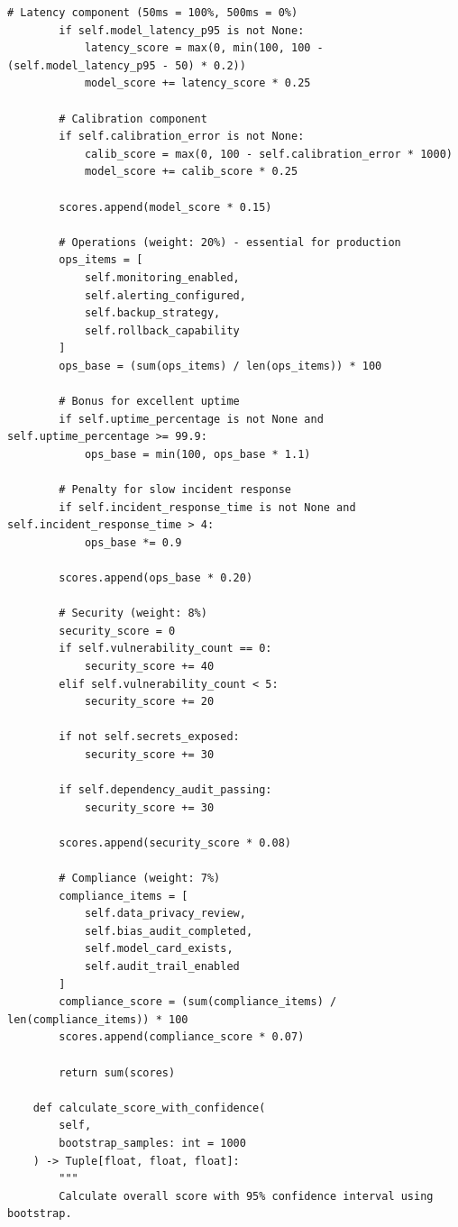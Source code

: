 \begin{lstlisting}[style=python, caption={Comprehensive project health metrics framework with 15+ dimensions}]
        # Latency component (50ms = 100%, 500ms = 0%)
        if self.model_latency_p95 is not None:
            latency_score = max(0, min(100, 100 - (self.model_latency_p95 - 50) * 0.2))
            model_score += latency_score * 0.25

        # Calibration component
        if self.calibration_error is not None:
            calib_score = max(0, 100 - self.calibration_error * 1000)
            model_score += calib_score * 0.25

        scores.append(model_score * 0.15)

        # Operations (weight: 20%) - essential for production
        ops_items = [
            self.monitoring_enabled,
            self.alerting_configured,
            self.backup_strategy,
            self.rollback_capability
        ]
        ops_base = (sum(ops_items) / len(ops_items)) * 100

        # Bonus for excellent uptime
        if self.uptime_percentage is not None and self.uptime_percentage >= 99.9:
            ops_base = min(100, ops_base * 1.1)

        # Penalty for slow incident response
        if self.incident_response_time is not None and self.incident_response_time > 4:
            ops_base *= 0.9

        scores.append(ops_base * 0.20)

        # Security (weight: 8%)
        security_score = 0
        if self.vulnerability_count == 0:
            security_score += 40
        elif self.vulnerability_count < 5:
            security_score += 20

        if not self.secrets_exposed:
            security_score += 30

        if self.dependency_audit_passing:
            security_score += 30

        scores.append(security_score * 0.08)

        # Compliance (weight: 7%)
        compliance_items = [
            self.data_privacy_review,
            self.bias_audit_completed,
            self.model_card_exists,
            self.audit_trail_enabled
        ]
        compliance_score = (sum(compliance_items) / len(compliance_items)) * 100
        scores.append(compliance_score * 0.07)

        return sum(scores)

    def calculate_score_with_confidence(
        self,
        bootstrap_samples: int = 1000
    ) -> Tuple[float, float, float]:
        """
        Calculate overall score with 95% confidence interval using bootstrap.


\end{lstlisting}
